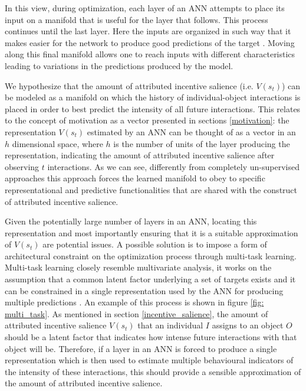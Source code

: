 In this view, during optimization, each layer of an ANN attempts to place its input on a manifold that is useful for the layer that follows. This process continues until the last layer. Here the inputs are organized in such way that it makes easier for the network to produce good predictions of the target \cite{bengio2017deep}. Moving along this final manifold allows one to reach inputs with different characteristics leading to variations in the predictions produced by the model. 

We hypothesize that the amount of attributed incentive salience (i.e. $V(s_{t})$) can be modeled as a manifold on which the history of individual-object interactions is placed in order to best predict the intensity of all future interactions. This relates to the concept of motivation as a vector presented in sections \ref{motivation}: the representation $V(s_{t})$ estimated by an ANN can be thought of as a vector in an $h$ dimensional space, where $h$ is the number of units of the layer producing the representation, indicating the amount of attributed incentive salience after observing $t$ interactions. As we can see, differently from completely un-supervised approaches this approach forces the learned manifold to obey to specific representational and predictive functionalities that are shared with the construct of attributed incentive salience. 

Given the potentially large number of layers in an ANN, locating this representation and most importantly ensuring that it is a suitable approximation of $V(s_{t})$ are potential issues. A possible solution is to impose a form of architectural constraint on the optimization process through multi-task learning. Multi-task learning closely resemble multivariate analysis, it  works on the assumption that a common latent factor underlying a set of targets exists and it can be constrained in a single representation used by the ANN for producing multiple predictions \cite{bengio2017deep}. An example of this process is shown in figure \ref{fig: multi_task}. As mentioned in section \ref{incentive_salience}, the amount of attributed incentive salience $V(s_t)$ that an individual $I$ assigns to an object $O$ should be a latent factor that indicates how intense future interactions with that object will be. Therefore, if a layer in an ANN is forced to produce a single representation which is then used to estimate multiple behavioural indicators of the intensity of these interactions, this should provide a sensible approximation of the amount of attributed incentive salience. 

